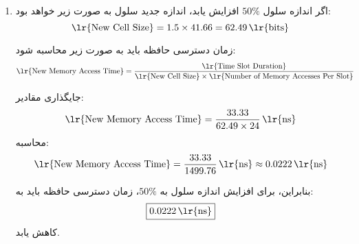 \begin{enumerate}
	\item [ ]
	\begin{qsolve}
		
		اگر اندازه سلول \(50\%\) افزایش یابد، اندازه جدید سلول به صورت زیر خواهد بود:
		\[
		\text{\lr{New Cell Size}} = 1.5 \times 41.66 = 62.49 \, \text{\lr{bits}}
		\]
		
		زمان دسترسی حافظه باید به صورت زیر محاسبه شود:
		\[
		\begin{aligned}
			\text{\lr{New Memory Access Time}} &= \frac{\text{\lr{Time Slot Duration}}}{\text{\lr{New Cell Size}} \times \text{\lr{Number of Memory Accesses Per Slot}}}
		\end{aligned}
		\]
		
		جایگذاری مقادیر:
		\[
		\text{\lr{New Memory Access Time}} = \frac{33.33}{62.49 \times 24} \, \text{\lr{ns}}
		\]
		محاسبه:
		\[
		\text{\lr{New Memory Access Time}} = \frac{33.33}{1499.76} \, \text{\lr{ns}} \approx 0.0222 \, \text{\lr{ns}}
		\]
		
		بنابراین، برای افزایش اندازه سلول به \(50\%\)، زمان دسترسی حافظه باید به:
		\[
		\boxed{0.0222 \, \text{\lr{ns}}}
		\]
		کاهش یابد.
	\end{qsolve}
\end{enumerate}